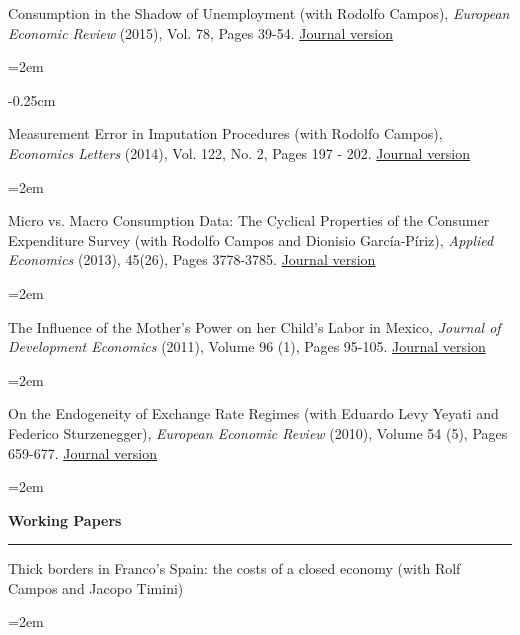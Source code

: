 \documentclass[12pt]{article}
\newcommand{\sepspace}{\vspace*{0.5em}}		%
\newcommand{\NewPart}[1]{ \vspace*{0.4cm} \noindent \large \textbf{#1}
\par \normalsize \normalfont \vspace*{-0.5cm} \noindent\rule{\textwidth}{1.8pt} \vspace*{-0.75cm} }
\newcommand{\EducationEntry}[4]{
		\noindent #1 \hfill      %
		\noindent #2 %
		\par  %
		\noindent \textit{#3} \par        %
		\noindent\hangindent=2em\hangafter=0  #4 %
		\normalsize \par}
\begin{document}
\vspace*{-0.25cm}

\EducationEntry{Consumption in the Shadow of Unemployment (with Rodolfo Campos), \textit{European Economic Review} (2015), Vol. 78, Pages 39-54. \href{https://www.sciencedirect.com/science/article/abs/pii/S0014292115000628}{Journal version}}{}{}

\vspace*{-0.25cm}

\EducationEntry{Measurement Error in Imputation Procedures (with Rodolfo Campos), \textit{Economics Letters} (2014), Vol. 122, No. 2, Pages 197 - 202.}{\href{https://ideas.repec.org/a/eee/ecolet/v122y2014i2p197-202.html}{Journal version}}{}{}

\vspace*{-0.25cm}

\EducationEntry{Micro vs. Macro Consumption Data: The Cyclical Properties of the Consumer Expenditure Survey (with Rodolfo Campos and Dionisio García-Píriz), \textit{Applied Economics} (2013), 45(26), Pages 3778-3785.}{\href{https://www.tandfonline.com/doi/full/10.1080/00036846.2012.732689}{Journal version}}{}{}

\vspace*{-0.25cm}

\EducationEntry{The Influence of the Mother's Power on her Child's Labor in Mexico, \textit{Journal of Development Economics} (2011), Volume 96 (1), Pages 95-105. \href{https://www.sciencedirect.com/science/article/abs/pii/S0304387810000738}{Journal version}}{}{}{}

\vspace*{-0.25cm}

\EducationEntry{On the Endogeneity of Exchange Rate Regimes (with Eduardo Levy Yeyati and Federico Sturzenegger), \textit{European Economic Review} (2010), Volume 54 (5), Pages 659-677.}{\href{https://www.sciencedirect.com/science/article/abs/pii/S0014292109001251}{Journal version}}{}{}

\vspace*{-0.5cm}
\NewPart{Working Papers}{}
\vspace*{0.25cm}

\EducationEntry{Thick borders in Franco’s Spain: the costs of a closed economy (with Rolf Campos and Jacopo Timini)}{}{}{}
\vspace*{-0.25cm}
\end{document}
